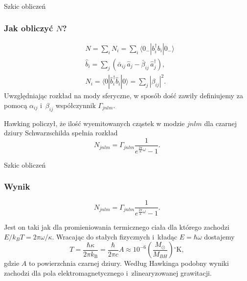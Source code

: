 \documentclass[10pt,t]{beamer}
\begin{document}
\begin{frame}{Szkic obliczeń}
  \frametitle{Jak obliczyć $N$?}


  \begin{align}
    \label{eq:Promieniowanie-Hawkinga-13}
    &N = \sum_{ i } N_{ i } =
      \sum_{ i } \langle 0_{ - } | b_{ i }^{ \dagger } b_{ i } | 0_{ - } \rangle \\
    &\widehat{ b }_{ i } =
      \sum_{ j } ( \bar{ \alpha }_{ i j }\, \widehat{ a }_{ j }
      - \bar{ \beta }_{ i j }\, \widehat{ a }^{ \dagger }_{ j } ), \\
    &N_{ i } =
      \langle 0 | \widehat{ b }^{ \dagger }_{ i } \widehat{ b }_{ i } | 0 \rangle =
      \sum_{ j } | \beta_{ i j } |^{ 2 }.
  \end{align}
  Uwzględniając rozkład na mody sferyczne, w sposób dość zawiły
  definiujemy za pomocą $\alpha_{ ij }$ i~$\beta_{ ij }$ współczynnik
  $\Gamma_{ jnlm }$.

  Hawking policzył, że ilość wyemitowanych cząstek w modzie $jnlm$ dla
  czarnej dziury Schwarzschilda spełnia rozkład
  \begin{equation}
    \label{eq:Promieniowanie-Hawkinga-14}
    N_{ jnlm } =
    \Gamma_{ jnlm } \frac{ 1 }{ e^{ \frac{ 2\pi }{ \kappa } \omega } - 1 }.
  \end{equation}

\end{frame}





\begin{frame}{Szkic obliczeń}
  \frametitle{Wynik}

  \begin{equation}
    \label{eq:Promieniowanie-Hawkinga-15}
    N_{ jnlm } =
    \Gamma_{ jnlm } \frac{ 1 }{ e^{ \frac{ 2\pi }{ \kappa } \omega } - 1 }.
  \end{equation}

  Jest on taki jak dla promieniowania termicznego ciała dla którego
  zachodzi $E / k_{ B } T = 2\pi \omega / \kappa$. Wracając do stałych
  fizycznych i~kładąc $E = \hbar \omega$ dostajemy
  \begin{equation}
    \label{eq:Promieniowanie-Hawkinga-15}
    T = \frac{ \hbar \kappa }{ 2\pi k_{ \mathrm{B} } } =
    \frac{ \hbar }{ 2\pi c } A \approx
    10^{ -6 } \left( \frac{ M_{ \odot } }{ M_{ BH } } \right)
    {}^{ \circ } \mathrm{K},
  \end{equation}
  gdzie $A$ to powierzchnia czarnej dziury. Według Hawkinga podobny
  wyniki zachodzi dla pola elektromagnetycznego i~zlinearyzowanej
  grawitacji.

\end{frame}
\end{document}
